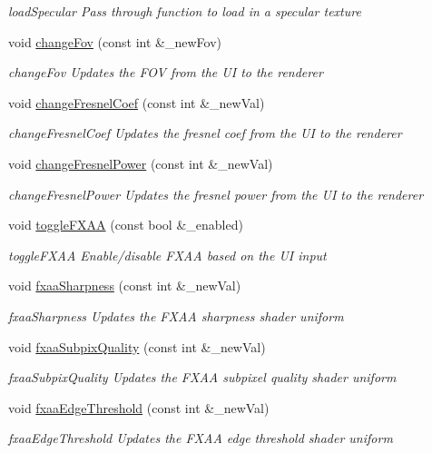 \begin{DoxyCompactItemize}
\begin{DoxyCompactList}\small\item\em load\-Specular Pass through function to load in a specular texture \end{DoxyCompactList}\item 
void \hyperlink{classNGLScene_ae4242aaaa2dc60172a46d463621bb8a2}{change\-Fov} (const int \&\-\_\-new\-Fov)
\begin{DoxyCompactList}\small\item\em change\-Fov Updates the F\-O\-V from the U\-I to the renderer \end{DoxyCompactList}\item 
void \hyperlink{classNGLScene_a20182f83391c960705b3de402b064386}{change\-Fresnel\-Coef} (const int \&\-\_\-new\-Val)
\begin{DoxyCompactList}\small\item\em change\-Fresnel\-Coef Updates the fresnel coef from the U\-I to the renderer \end{DoxyCompactList}\item 
void \hyperlink{classNGLScene_ae4c42b19a25e4b43b804202c79c89bc2}{change\-Fresnel\-Power} (const int \&\-\_\-new\-Val)
\begin{DoxyCompactList}\small\item\em change\-Fresnel\-Power Updates the fresnel power from the U\-I to the renderer \end{DoxyCompactList}\item 
void \hyperlink{classNGLScene_a51c28cc0b7e022828003de95f1ea5523}{toggle\-F\-X\-A\-A} (const bool \&\-\_\-enabled)
\begin{DoxyCompactList}\small\item\em toggle\-F\-X\-A\-A Enable/disable F\-X\-A\-A based on the U\-I input \end{DoxyCompactList}\item 
void \hyperlink{classNGLScene_aebb9ebf6d1523bb0669da8c84113c943}{fxaa\-Sharpness} (const int \&\-\_\-new\-Val)
\begin{DoxyCompactList}\small\item\em fxaa\-Sharpness Updates the F\-X\-A\-A sharpness shader uniform \end{DoxyCompactList}\item 
void \hyperlink{classNGLScene_aa45b262a9ee4669f842a9ebf3716d338}{fxaa\-Subpix\-Quality} (const int \&\-\_\-new\-Val)
\begin{DoxyCompactList}\small\item\em fxaa\-Subpix\-Quality Updates the F\-X\-A\-A subpixel quality shader uniform \end{DoxyCompactList}\item 
void \hyperlink{classNGLScene_afeaf7b8feeedbed5ead3db706a07c9b6}{fxaa\-Edge\-Threshold} (const int \&\-\_\-new\-Val)
\begin{DoxyCompactList}\small\item\em fxaa\-Edge\-Threshold Updates the F\-X\-A\-A edge threshold shader uniform \end{DoxyCompactList}\end{DoxyCompactItemize}
